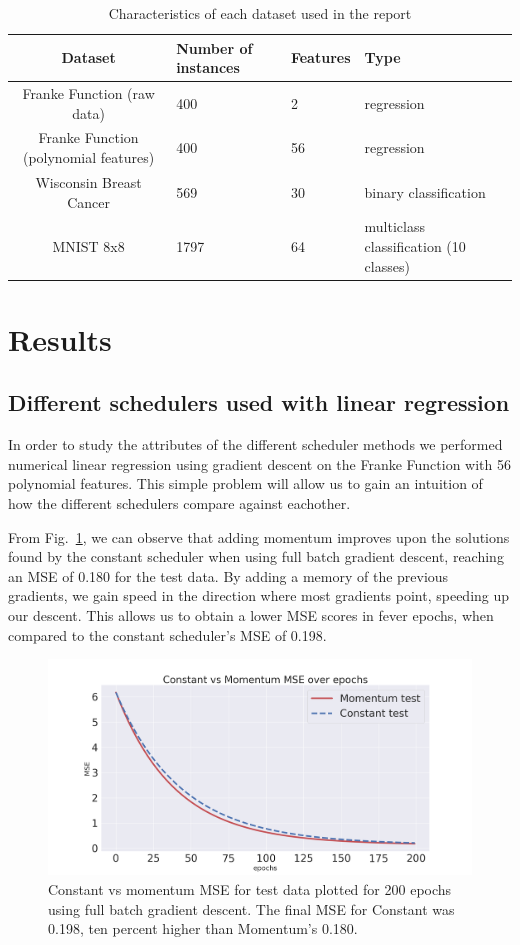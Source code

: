 \documentclass[onecolumn,10pt,cleanfoot]{asme2ej}
\begin{document}
\begin{table}[h]
\caption{Characteristics of each dataset used in the report}
\begin{center}
\label{datasettable}
\begin{tabular}{| c | l | l | l |}
\hline
Dataset & Number of instances & Features & Type \\
\hline
Franke Function (raw data) & 400 & 2 & regression \\
Franke Function (polynomial features) & 400 & 56 & regression \\
Wisconsin Breast Cancer & 569 & 30 & binary classification \\
MNIST 8x8 & 1797 & 64 & multiclass classification (10 classes) \\
\hline
\end{tabular}
\end{center}
\end{table}

\section{Results}

\subsection{Different schedulers used with linear regression}

In order to study the attributes of the different scheduler methods we performed numerical linear regression using gradient descent on the Franke Function with 56 polynomial features. This simple problem will allow us to gain an intuition of how the different schedulers compare against eachother. 

From  Fig.~\ref{constant_v_momentum}, we can observe that adding momentum improves upon the solutions found by the constant scheduler when using full batch gradient descent, reaching an MSE of 0.180 for the test data. By adding a memory of the previous gradients, we gain speed in the direction where most gradients point, speeding up our descent. This allows us to obtain a lower MSE scores in fever epochs, when compared to the constant scheduler's MSE of 0.198.

\begin{figure}[H]
\centerline{\includegraphics[width=5in]{figure/constant_v_momentum.png}}
\caption{Constant vs momentum MSE for test data plotted for 200 epochs using full batch gradient descent. The final MSE for Constant was 0.198, ten percent higher than Momentum's 0.180.}
\label{constant_v_momentum}
\end{figure}
\end{document}
